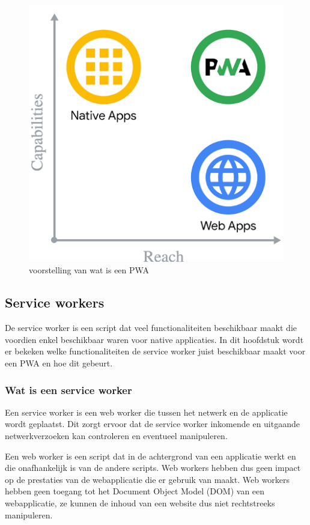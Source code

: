 \begin{figure}[!htb]
	\centering
	\includegraphics{./img/WatIsEenPwa.png}
	\caption{voorstelling van wat is een PWA \autocite{Richard2020}}
\end{figure}


\subsection{Service workers}

	De service worker is een script dat veel functionaliteiten beschikbaar maakt die voordien enkel beschikbaar waren voor native applicaties. In dit hoofdstuk wordt er bekeken welke functionaliteiten de service worker juist beschikbaar maakt voor een PWA en hoe dit gebeurt. 
	
	
	
	\subsubsection{Wat is een service worker}
	\label{ch: Wat is een servcie worker}
	
		Een service worker is een web worker die tussen het netwerk en de applicatie wordt geplaatst. Dit zorgt ervoor dat de service worker inkomende en uitgaande netwerkverzoeken kan controleren en eventueel manipuleren.
		\autocite{Mozilla2020}
		
		Een web worker is een script dat in de achtergrond van een applicatie werkt en die onafhankelijk is van de andere scripts. Web workers hebben dus geen impact op de prestaties van de webapplicatie die er gebruik van maakt.  Web workers hebben geen toegang tot het Document Object Model (DOM) van een webapplicatie, ze kunnen de inhoud van een website dus niet rechtstreeks manipuleren.
		\autocite{Verdu2015}
		\autocite{Hiltunen2018}
		
